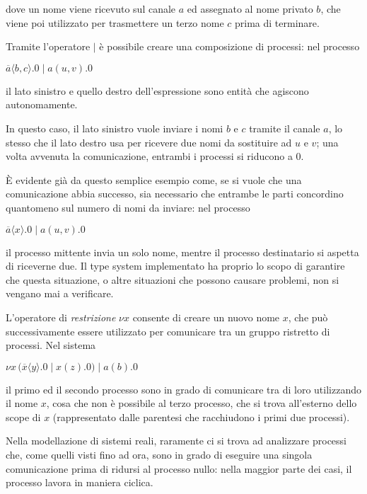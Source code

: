 dove un nome viene ricevuto sul canale $a$ ed assegnato al nome privato
$b$, che viene poi utilizzato per trasmettere un terzo nome $c$ prima di
terminare.

Tramite l'operatore $|$ \`e possibile creare una composizione di processi:
nel processo

\begin{pilisting}
$
    \overline{a}\langle b,c\rangle.0 \; | \;
    a(u,v).0
$
\end{pilisting}

il lato sinistro e quello destro dell'espressione sono entit\`a che agiscono
autonomamente.

In questo caso, il lato sinistro vuole inviare i nomi $b$ e $c$ tramite il
canale $a$, lo stesso che il lato destro usa per ricevere due nomi da
sostituire ad $u$ e $v$; una volta avvenuta la comunicazione, entrambi i
processi si riducono a $0$.

\`E evidente gi\`a da questo semplice esempio come, se si vuole che una
comunicazione abbia successo, sia necessario che entrambe le parti
concordino quantomeno sul numero di nomi da inviare: nel processo

\begin{pilisting}
$
    \overline{a}\langle x\rangle.0 \; | \;
    a(u,v).0
$
\end{pilisting}

il processo mittente invia un solo nome, mentre il processo destinatario
si aspetta di riceverne due. Il type system implementato ha proprio lo
scopo di garantire che questa situazione, o altre situazioni che possono
causare problemi, non si vengano mai a verificare.

L'operatore di \emph{restrizione} $\nu x$ consente di creare un nuovo nome
$x$, che pu\`o successivamente essere utilizzato per comunicare tra un
gruppo ristretto di processi. Nel sistema

\begin{pilisting}
$
    \nu x \, (
      \overline{x}\langle y\rangle.0 \; | \;
      x(z).0
    ) \; | \;
    a(b).0
$
\end{pilisting}

il primo ed il secondo processo sono in grado di comunicare tra di loro
utilizzando il nome $x$, cosa che non \`e possibile al terzo processo, che
si trova all'esterno dello scope di $x$ (rappresentato dalle parentesi che
racchiudono i primi due processi).

Nella modellazione di sistemi reali, raramente ci si trova ad analizzare
processi che, come quelli visti fino ad ora, sono in grado di eseguire una
singola comunicazione prima di ridursi al processo nullo: nella maggior
parte dei casi, il processo lavora in maniera ciclica.

